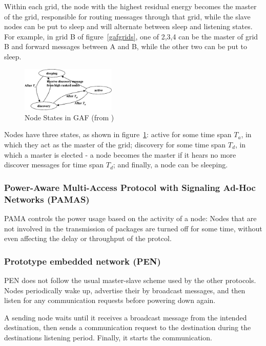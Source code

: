 \documentclass[conference]{IEEEtran}
\begin{document}
Within each grid, the node with the highest residual energy becomes the master
of the grid, responsible for routing messages through that grid, while the
slave nodes can be put to sleep and will alternate between sleep and listening
states. For example, in grid B of figure~\ref{gafgrids}, one of 2,3,4 can be the
master of grid B and forward messages between A and B, while the other two can
be put to sleep.


\begin{figure}
\includegraphics[width=0.4\textwidth]{images/gaf-states}
\caption{Node States in GAF (from \cite{alotaibi2012survey})}
\label{gafstates}
\end{figure}
Nodes have three states, as shown in figure~\ref{gafstates}: active for some time span $T_{a}$, in which they
act as the master of the grid; discovery for some time span $T_{d}$, in which a
master is elected - a node becomes the master if it hears no more discover messages
for time span $T_{d}$; and finally, a node can be sleeping.




\subsubsection{Power-Aware Multi-Access Protocol with Signaling Ad-Hoc Networks (PAMAS)}
PAMA\cite{singh1998pamas} controls the power usage based on the activity of
a node: Nodes that are not involved in the transmission of packages are turned
off for some time, without even affecting the delay or throughput of the
protcol.\cite{singh1998pamas}

\subsubsection{Prototype embedded network (PEN)}
PEN\cite{girling2000design} does not follow the usual master-slave scheme
used by the other protocols. Nodes periodically wake up, advertise their
by broadcast messages, and then listen for any communication requests before
powering down again.

A sending node waits until it receives a broadcast message from the intended
destination, then sends a communication request to the destination during
the destinations listening period. Finally, it starts the communication.
\end{document}
